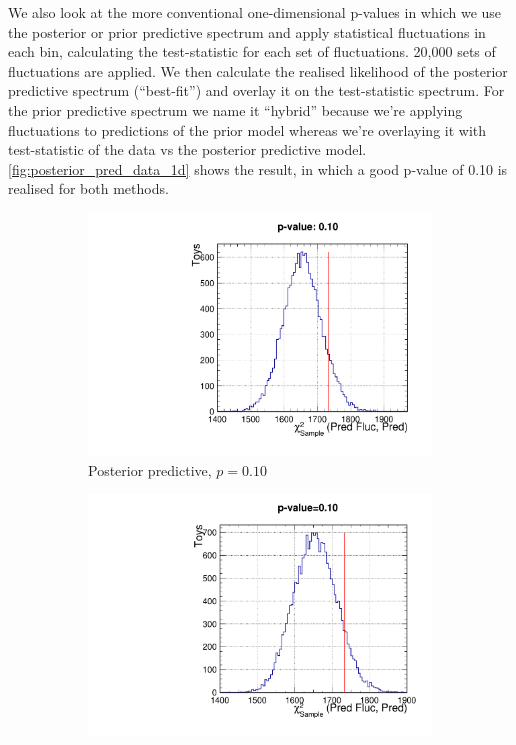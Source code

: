 We also look at the more conventional one-dimensional p-values in which we use the posterior or prior predictive spectrum and apply statistical fluctuations in each bin, calculating the test-statistic for each set of fluctuations. 20,000 sets of fluctuations are applied. We then calculate the realised likelihood of the posterior predictive spectrum (``best-fit'') and overlay it on the test-statistic spectrum. For the prior predictive spectrum we name it ``hybrid'' because we're applying fluctuations to predictions of the prior model whereas we're overlaying it with test-statistic of the data vs the posterior predictive model. \autoref{fig:posterior_pred_data_1d} shows the result, in which a good p-value of 0.10 is realised for both methods.

\begin{figure}[h]
	\begin{subfigure}[t]{0.49\textwidth}
		\includegraphics[width=\textwidth, trim={0mm 0mm 0mm 14mm}, clip,page=1]{figures/mach3/data/postpred/postpred_pvalue_1d}
		\caption{Posterior predictive, $p=0.10$}
	\end{subfigure}
	\begin{subfigure}[t]{0.49\textwidth}
		\includegraphics[width=\textwidth, trim={0mm 0mm 0mm 14mm}, clip,page=1]{figures/mach3/data/postpred/PriorPredictive_Hybrid}

\end{subfigure}
\end{figure}
